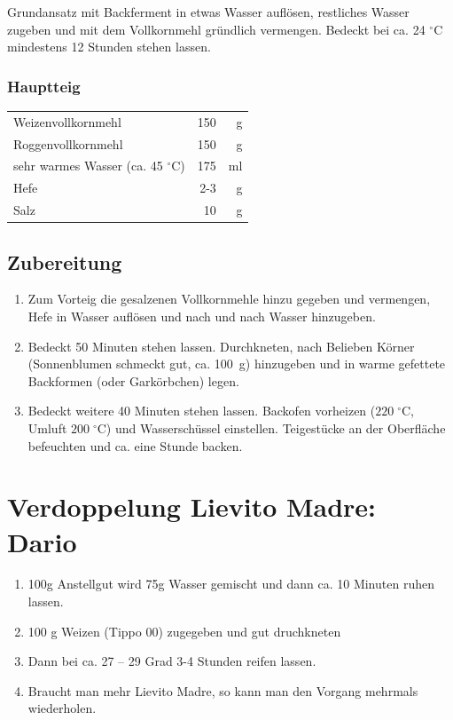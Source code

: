\documentclass[10pt,a4paper,ngerman, DIV=16]{scrartcl}
\begin{document}
Grundansatz mit Backferment in etwas Wasser auflösen, restliches Wasser zugeben und mit dem Vollkornmehl gründlich vermengen. Bedeckt bei ca. 24 $^{\circ} $C mindestens 12 Stunden stehen lassen. 

\subsubsection*{Hauptteig}
\begin{tabular}{lrr}
    Weizenvollkornmehl & 150 &  g \\
    Roggenvollkornmehl & 150 &  g \\
    sehr warmes Wasser (ca. 45 $^\circ$C) & 175 & ml \\
    Hefe   & 2-3          &   g \\
    Salz        & 10 & g \\
\end{tabular} 

\subsection*{Zubereitung}

\begin{enumerate}
    \item Zum Vorteig die gesalzenen Vollkornmehle hinzu gegeben und vermengen, Hefe in Wasser auflösen und nach und nach Wasser hinzugeben.
    \item Bedeckt 50 Minuten stehen lassen. Durchkneten, nach Belieben Körner (Sonnenblumen schmeckt gut, ca. 100~g) hinzugeben und in warme gefettete Backformen  (oder Garkörbchen) legen.
    \item Bedeckt weitere 40 Minuten stehen lassen. Backofen vorheizen ($ 220\;^{\circ} $C, Umluft $ 200\;^{\circ} $C) und Wasserschüssel einstellen. Teigestücke an der Oberfläche befeuchten und ca. eine Stunde backen.    
\end{enumerate}  


\section{Verdoppelung Lievito Madre: Dario}\label{sec:Lievito Madre}

\begin{enumerate}
    \item 100\;g Anstellgut wird 75\;g Wasser gemischt und dann ca. 10 Minuten ruhen lassen.  
    \item 100 g Weizen (Tippo  00) zugegeben und gut druchkneten
    \item Dann bei ca. 27 -- 29 Grad 3-4 Stunden reifen lassen.
    \item Braucht man mehr Lievito Madre, so kann man den Vorgang mehrmals wiederholen.
\end{enumerate}
\end{document}
